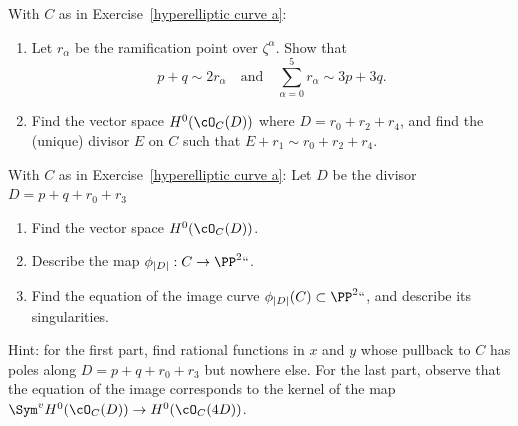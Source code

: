 \begin{exercise} With $C$ as in Exercise~\ref{hyperelliptic curve a}:
\begin{enumerate}

\item Let $r_\alpha$ be the ramification point over $\zeta^\alpha$. Show that
$$
p+q \sim 2r_\alpha \quad \text{and} \quad \sum_{\alpha = 0}^5 r_\alpha \sim 3p+3q.
$$

\item Find the vector space $H^0(\cO_C(D))$ where $D = r_0 + r_2 + r_4$, and find the (unique) divisor $E$ on $C$ such that $E + r_1 \sim r_0 + r_2 + r_4$.

\end{enumerate}

\end{exercise}

\begin{exercise}
With $C$ as in Exercise~\ref{hyperelliptic curve a}:
Let $D$ be the divisor $D = p + q + r_0 + r_3$
\begin{enumerate}
\item Find the vector space $H^0(\cO_C(D))$.
\item Describe the map $\phi_{|D|} : C \to \PP^2` `$.
\item Find the equation of the image curve $\phi_{|D|}(C) \subset \PP^2` `$, and describe its singularities.
\end{enumerate}
Hint: for the first part, find rational functions in $x$ and $y$ whose pullback to $C$ has poles along $D = p + q + r_0 + r_3$ but nowhere else. For the last part, observe that the equation of the image corresponds to the kernel of the map $\Sym^v H^0(\cO_C(D)) \to H^0(\cO_C(4D))$.
\end{exercise}
 
